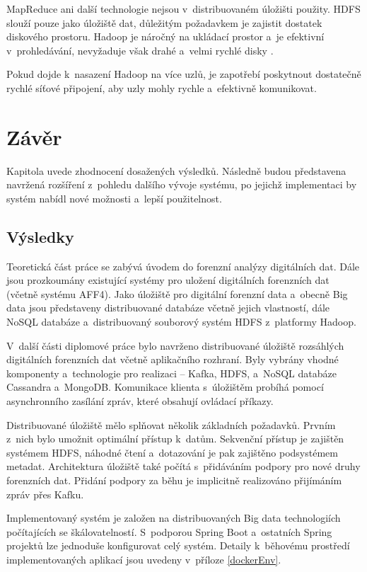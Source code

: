MapReduce ani další technologie nejsou v~distribuovaném úložišti použity. HDFS slouží pouze jako úložiště dat, důležitým požadavkem je zajistit dostatek diskového prostoru. Hadoop je náročný na ukládací prostor a~je efektivní v~prohledávání, nevyžaduje však drahé a~velmi rychlé disky \cite{bestPracticesHadoopHW}.

Pokud dojde k~nasazení Hadoop na více uzlů, je zapotřebí poskytnout dostatečně rychlé síťové připojení, aby uzly mohly rychle a~efektivně komunikovat.

\chapter{Závěr}
Kapitola uvede zhodnocení dosažených výsledků. Následně budou představena navržená rozšíření z~pohledu dalšího vývoje systému, po jejichž implementaci by systém nabídl nové možnosti a~lepší použitelnost.

\section{Výsledky}
Teoretická část práce se zabývá úvodem do forenzní analýzy digitálních dat. Dále jsou prozkoumány existující systémy pro uložení digitálních forenzních dat (včetně systému AFF4). Jako úložiště pro digitální forenzní data a~obecně Big data jsou představeny distribuované databáze včetně jejich vlastností, dále NoSQL databáze a~distribuovaný souborový systém HDFS z~platformy Hadoop.

V~další části diplomové práce bylo navrženo distribuované úložiště rozsáhlých digitálních forenzních dat včetně aplikačního rozhraní. Byly vybrány vhodné komponenty a~technologie pro realizaci -- Kafka, HDFS, a~NoSQL databáze Cassandra a~MongoDB. Komunikace klienta s~úložištěm probíhá pomocí asynchronního zasílání zpráv, které obsahují ovládací příkazy.

Distribuované úložiště mělo splňovat několik základních požadavků. Prvním z~nich bylo umožnit optimální přístup k~datům. Sekvenční přístup je zajištěn systémem HDFS, náhodné čtení a~dotazování je pak zajištěno podsystémem metadat.
Architektura úložiště také počítá s~přidáváním podpory pro nové druhy forenzních dat. Přidání podpory za běhu je implicitně realizováno přijímáním zpráv přes Kafku.

Implementovaný systém je založen na distribuovaných Big data technologiích počítajících se škálovatelností. S~podporou Spring Boot a~ostatních Spring projektů lze jednoduše konfigurovat celý systém. Detaily k~běhovému prostředí implementovaných aplikací jsou uvedeny v~příloze \ref{dockerEnv}.

